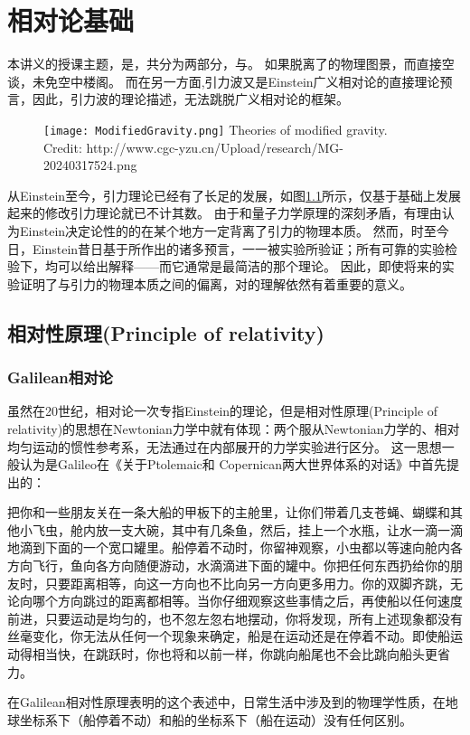 \chapter{相对论基础}

本讲义的授课主题，是\gw\DA，共分为两部分，\emph{\gw}与\emph{\DA}。
如果脱离了\gw 的物理图景，而直接空谈\DA，未免空中楼阁。
而在另一方面,引力波又是Einstein广义相对论的直接理论预言，因此，引力波的理论描述，无法跳脱广义相对论的框架。

\begin{figure}[htp]
\centering
\texttt{[image: ModifiedGravity.png]}
  {Theories of modified gravity. Credit: http://www.cgc-yzu.cn/Upload/research/MG-20240317524.png}
\label{fig:ModGrav}
\end{figure}

从Einstein至今，引力理论已经有了长足的发展，如图\ref{fig:ModGrav}所示，仅基于\GR 基础上发展起来的修改引力理论就已不计其数。
由于和量子力学原理的深刻矛盾，有理由认为Einstein决定论性的的\GR 在某个地方一定背离了引力的物理本质。
然而，时至今日，Einstein昔日基于\GR 所作出的诸多预言，一一被实验所验证；所有可靠的实验检验下，\GR 均可以给出解释——而它通常是最简洁的那个理论。
因此，即使将来的实验证明了\GR 与引力的物理本质之间的偏离，对\GR 的理解依然有着重要的意义。

\section{相对性原理(Principle of relativity)}

\subsection{Galilean相对论}
虽然在20世纪，相对论一次专指Einstein的理论，但是相对性原理(Principle of relativity)的思想在Newtonian力学中就有体现：两个服从Newtonian力学的、相对均匀运动的惯性参考系，无法通过在内部展开的力学实验进行区分。
这一思想一般认为是Galileo在《关于Ptolemaic和 Copernican两大世界体系的对话》中首先提出的\cite{Fang2012blog}：
\begin{myprop}{}{}
把你和一些朋友关在一条大船的甲板下的主舱里，让你们带着几支苍蝇、蝴蝶和其他小飞虫，舱内放一支大碗，其中有几条鱼，然后，挂上一个水瓶，让水一滴一滴地滴到下面的一个宽口罐里。船停着不动时，你留神观察，小虫都以等速向舱内各方向飞行，鱼向各方向随便游动，水滴滴进下面的罐中。你把任何东西扔给你的朋友时，只要距离相等，向这一方向也不比向另一方向更多用力。你的双脚齐跳，无论向哪个方向跳过的距离都相等。当你仔细观察这些事情之后，再使船以任何速度前进，只要运动是均匀的，也不忽左忽右地摆动，你将发现，所有上述现象都没有丝毫变化，你无法从任何一个现象来确定，船是在运动还是在停着不动。即使船运动得相当快，在跳跃时，你也将和以前一样，你跳向船尾也不会比跳向船头更省力。
\end{myprop}
在Galilean相对性原理表明的这个表述中，日常生活中涉及到的物理学性质，在地球坐标系下（船停着不动）和船的坐标系下（船在运动）没有任何区别。

